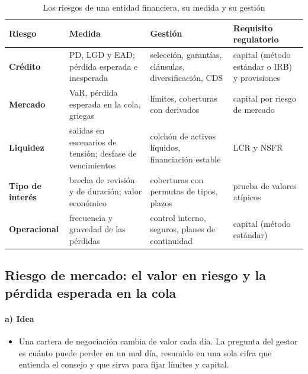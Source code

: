 \documentclass[11pt]{article}
\begin{document}
\begin{table}[H]
\centering
\caption{Los riesgos de una entidad financiera, su medida y su gestión}\label{tab:riesgos}
\small
\begin{tabular}{>{\raggedright\arraybackslash}m{2.4cm}|>{\raggedright\arraybackslash}m{3.7cm}|>{\raggedright\arraybackslash}m{3.9cm}|>{\raggedright\arraybackslash}m{3.6cm}}
\rowcolor{tceeazulpalido}\textbf{Riesgo} & \textbf{Medida} & \textbf{Gestión} & \textbf{Requisito regulatorio}\\ \hline
\textbf{\textcolor{tceemorado}{Crédito}} & PD, LGD y EAD; pérdida esperada e inesperada & selección, garantías, cláusulas, diversificación, CDS & capital (método estándar o IRB) y provisiones\\ \hline
\textbf{\textcolor{tceeazul}{Mercado}} & VaR, pérdida esperada en la cola, griegas & límites, coberturas con derivados & capital por riesgo de mercado\\ \hline
\textbf{\textcolor{tceedorado}{Liquidez}} & salidas en escenarios de tensión; desfase de vencimientos & colchón de activos líquidos, financiación estable & LCR y NSFR\\ \hline
\textbf{\textcolor{tceerojo}{Tipo de interés}} & brecha de revisión y de duración; valor económico & coberturas con permutas de tipos, plazos & prueba de valores atípicos\\ \hline
\textbf{\textcolor{tceegris}{Operacional}} & frecuencia y gravedad de las pérdidas & control interno, seguros, planes de continuidad & capital (método estándar)\\
\end{tabular}
\end{table}

\subsection{Riesgo de mercado: el valor en riesgo\cortetitulo{} y la pérdida esperada en la cola}\label{sec:var}

\paragraph{a) Idea}

\begin{itemize}
\item Una cartera de negociación cambia de valor cada día. La pregunta del gestor es cuánto puede perder en un mal día, resumido en una sola cifra que entienda el consejo y que sirva para fijar límites y capital.
\end{itemize}
\end{document}
